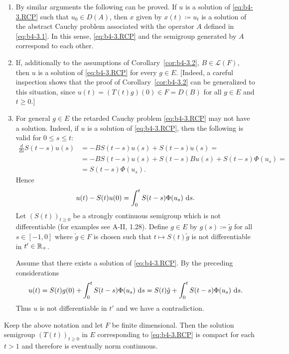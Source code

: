\begin{remarks*} 
\begin{enumerate}[\upshape (i), wide, labelindent=.5em]

\item 
By similar arguments the following can be proved. If $u$ is a solution of \eqref{eq:b4-3.RCP} such that $u_{0} \in D(A)$, then $x$ given by $x(t) \coloneq  u_t$ is a solution of the abstract Cauchy problem associated with the operator $A$ defined in \eqref{eq:b4-3.1}. 
In this sense, \eqref{eq:b4-3.RCP} and the semigroup generated by $A$ correspond to each other.

\item 
If, additionally to the assumptions of Corollary~\ref{cor:b4-3.2}, $B \in \mathcal{L}(F)$, then $u$ is a solution of \eqref{eq:b4-3.RCP} for every $g \in E$. 
[Indeed, a careful inspection shows that the proof of Corollary~\ref{cor:b4-3.2} can be generalized to this situation, since $u(t) = (T(t)g)(0) \in F = D(B)$ for all $g \in E$ and $t \geq 0$.]

\item 
For general $g \in E$ the retarded Cauchy problem \eqref{eq:b4-3.RCP} may not have a solution. 
Indeed, if $u$ is a solution of \eqref{eq:b4-3.RCP}, then the following is valid for $0 \leq s \leq t$:
\begin{equation*}
	\begin{aligned}
\frac{d}{ds}S(t-s)u(s) &= -BS(t-s)u(s) + S(t-s)\dot{u}(s) =\\
& = -BS(t-s)u(s) + S(t-s)Bu(s) + S(t-s)\Phi(u_s) = \\ & =S(t-s)\Phi(u_s) .
\end{aligned}
\end{equation*} 
Hence
\[
u(t) - S(t)u(0) = \int_0^t S(t-s)\Phi(u_s) \,\mathop{}\!\mathrm{d}{s}.
\]
Let $(S(t))_{t \geq 0}$ be a strongly continuous semigroup which is not differentiable (for examples see A-II,  1.28). 
Define $g \in E$ by $g(s)  \coloneq  \tilde{g}$ for all $s \in [-1,0]$ where $\tilde{g} \in F$ is chosen such that
$t \mapsto S(t)\tilde{g}$ is not differentiable in $t' \in \mathbb{R}_+$.

Assume that there exists a solution of \eqref{eq:b4-3.RCP}. 
By the preceding considerations
\[
u(t) = S(t)g(0) + \int_0^t S(t-s)\Phi(u_s) \,\mathop{}\!\mathrm{d}{s} = S(t)\tilde{g} + \int_0^t S(t-s)\Phi(u_s) \,\mathop{}\!\mathrm{d}{s} .
\]
Thus $u$ is not differentiable in $t'$ and we have a contradiction.
\end{enumerate}
\end{remarks*}
\begin{corollary}\label{cor:b4-3.3}
%
%
	Keep the above notation and let $F$ be finite dimensional. 
    Then the solution semigroup $(T(t))_{t \geq 0}$ in $E$ corresponding to \eqref{eq:b4-3.RCP} is compact for each $t > 1$ and therefore is eventually norm continuous.
\end{corollary}

